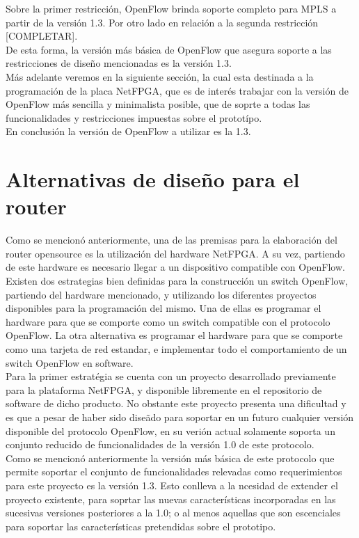 Sobre la primer restricci\'on, OpenFlow brinda soporte completo para MPLS a partir de la versi\'on 1.3. Por otro lado en relaci\'on a la segunda restricci\'on [COMPLETAR].\\

De esta forma, la versi\'on m\'as b\'asica de OpenFlow que asegura soporte a las restricciones de dise\~no mencionadas es la versi\'on 1.3.\\

M\'as adelante veremos en la siguiente secci\'on, la cual  esta destinada a la programaci\'on de la placa NetFPGA, que es de inter\'es trabajar con la versi\'on de OpenFlow m\'as sencilla y minimalista posible, que de soprte a todas las funcionalidades y restricciones impuestas sobre el protot\'ipo.\\ 

En conclusi\'on la versi\'on de OpenFlow a utilizar es la 1.3.

\section[Alternativas de dise\~no para el router]{Alternativas de dise\~no para el router}

Como se mencion\'o anteriormente, una de las premisas para la elaboraci\'on del router opensource es la utilizaci\'on del hardware NetFPGA. A su vez, partiendo de este hardware es necesario llegar a un dispositivo compatible con OpenFlow.\\ 

Existen dos estrategias bien definidas para la construcci\'on un switch OpenFlow, partiendo del hardware mencionado, y utilizando los diferentes proyectos disponibles para la programaci\'on del mismo. Una de ellas es programar el hardware para que se comporte como un switch compatible con el protocolo OpenFlow. La otra alternativa es programar el hardware para que se comporte como una tarjeta de red estandar, e implementar todo el comportamiento de un switch OpenFlow en software.\\

Para la primer estrat\'egia se cuenta con un proyecto desarrollado previamente para la plataforma NetFPGA, y disponible libremente en el repositorio de software de dicho producto. No obstante este proyecto presenta una dificultad y es que a pesar de haber sido dise\~ado para soportar en un futuro cualquier versi\'on disponible del protocolo OpenFlow, en su veri\'on actual solamente soporta un conjunto reducido de funcionalidades de la versi\'on 1.0 de este protocolo. \\
Como se mencion\'o anteriormente la versi\'on m\'as b\'asica de este protocolo que permite soportar el conjunto de funcionalidades relevadas como requerimientos para este proyecto es la versi\'on 1.3. Esto conlleva a la ncesidad de extender el proyecto existente, para soprtar las nuevas caracter\'isticas incorporadas en las sucesivas versiones posteriores a la 1.0; o al menos aquellas que son escenciales para soportar las caracter\'isticas pretendidas sobre el prototipo.\\

